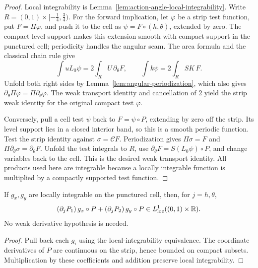 \begin{proof}
\leanok
Local integrability is Lemma~\ref{lem:action-angle-local-integrability}.
Write $R=(0,1)\times[-\frac14,\frac34)$.
For the forward implication, let $\varphi$ be a strip test function,
put $F=\Pi\varphi$, and push it to the cell as
$\psi=F\circ(h,\theta)$, extended by zero. The compact level support
makes this extension smooth with compact support in the punctured cell;
periodicity handles the angular seam. The area formula and the classical
chain rule give
\[
  \int uL_0\psi=2\int_R U\,\partial_\theta F,\qquad
  \int k\psi=2\int_R SK\,F.
\]
Unfold both right sides by Lemma~\ref{lem:angular-periodization}, which
also gives $\partial_\theta\Pi\varphi=\Pi\partial_\theta\varphi$.
The weak transport identity and cancellation of $2$ yield the strip
weak identity for the original compact test $\varphi$.

Conversely, pull a cell test $\psi$ back to $F=\psi\circ P$, extending
by zero off the strip. Its level support lies in a closed interior band,
so this is a smooth periodic function. Test the strip identity against
$\sigma=\mathcal CF$. Periodization gives $\Pi\sigma=F$ and
$\Pi\partial_\theta\sigma=\partial_\theta F$. Unfold the test integrals
to $R$, use $\partial_\theta F=S(L_0\psi)\circ P$, and change variables
back to the cell. This is the desired weak transport identity.
All products used here are integrable because a locally integrable
function is multiplied by a compactly supported test function.
\end{proof}

\begin{lemma}
\label{lem:action-angle-gradient-local-integrability}
\leanok
If $g_x,g_y$ are locally integrable on the punctured cell, then, for
$j=h,\theta$,
\[
  (\partial_jP_1)\,g_x\circ P+(\partial_jP_2)\,g_y\circ P
    \in L^1_{\mathrm{loc}}((0,1)\times\mathbb{R}).
\]
No weak derivative hypothesis is needed.
\end{lemma}

\begin{proof}
\leanok
Pull back each $g_i$ using the local-integrability equivalence. The
coordinate derivatives of $P$ are continuous on the strip, hence
bounded on compact subsets. Multiplication by these coefficients and
addition preserve local integrability.
\end{proof}

